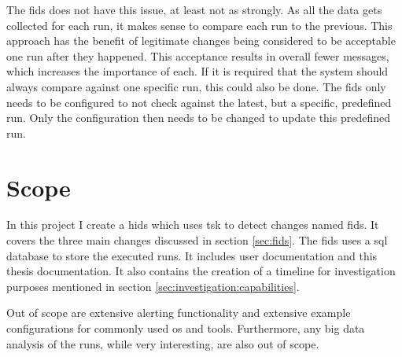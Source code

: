 The \gls{fids} does not have this issue, at least not as strongly. As all the data gets collected for each run, it makes sense to compare each run to the previous. This approach has the benefit of legitimate changes being considered to be acceptable one run after they happened. This acceptance results in overall fewer messages, which increases the importance of each. If it is required that the system should always compare against one specific run, this could also be done. The \gls{fids} only needs to be configured to not check against the latest, but a specific, predefined run. Only the configuration then needs to be changed to update this predefined run. 

\section{Scope}

In this project I create a \gls{hids} which uses \gls{tsk} to detect changes named \gls{fids}. It covers the three main changes discussed in section \ref{sec:fids}. The \gls{fids} uses a \gls{sql} database to store the executed runs. It includes user documentation and this thesis documentation. It also contains the creation of a timeline for investigation purposes mentioned in section \ref{sec:investigation:capabilities}.

Out of scope are extensive alerting functionality and extensive example configurations for commonly used \gls{os} and tools. Furthermore, any big data analysis of the runs, while very interesting, are also out of scope.

